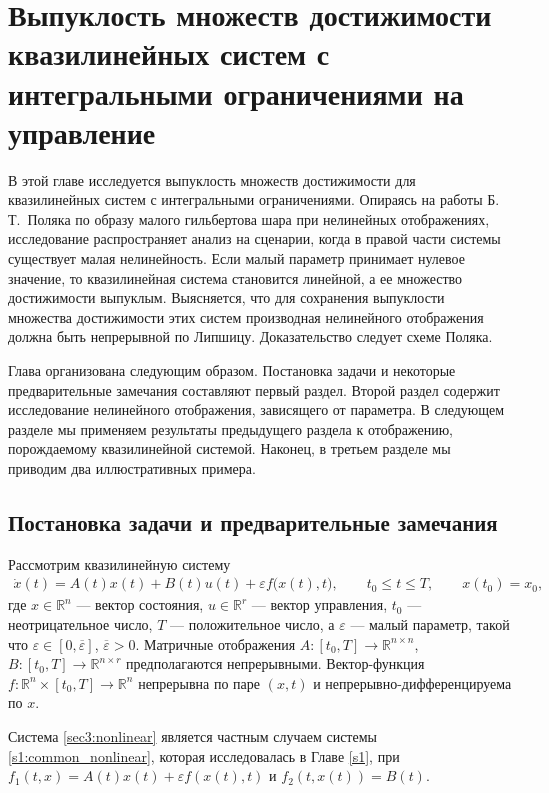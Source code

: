 \documentclass[../main.tex]{subfiles}
\begin{document}
\clearpage
\section{Выпуклость множеств достижимости квазилинейных систем с интегральными ограничениями на управление}
В этой главе исследуется выпуклость множеств достижимости для квазилинейных систем с интегральными ограничениями. 
Опираясь на работы Б.\,Т.~Поляка \cite{Polyak2001,Polyak2004} по образу малого гильбертова шара при нелинейных отображениях, исследование распространяет анализ на сценарии, когда в правой части системы существует малая нелинейность. 
Если малый параметр принимает нулевое значение, то квазилинейная система становится линейной, а ее множество достижимости выпуклым. 
Выясняется, что для сохранения выпуклости множества достижимости этих систем производная нелинейного отображения должна быть непрерывной по Липшицу. 
Доказательство следует схеме Поляка. 

Глава организована следующим образом. 
Постановка задачи и некоторые предварительные замечания составляют первый раздел. 
Второй раздел содержит исследование нелинейного отображения, зависящего от параметра. 
В следующем разделе мы применяем результаты предыдущего раздела к отображению, порождаемому квазилинейной системой. 
Наконец, в третьем разделе мы приводим два иллюстративных примера.

\subsection{Постановка задачи и предварительные замечания}

Рассмотрим квазилинейную систему
\begin{gather}\label{sec3:nonlinear}
 \dot{x}(t) = A(t)x(t)+B(t)u(t)+\varepsilon f\big(x(t),t\big), \qquad t_0 \leqslant t \leqslant T, \qquad x(t_0) = x_0,
\end{gather}
где $ x \in \mathbb{R}^n $ --- вектор состояния, $ u \in \mathbb{R}^r $ --- вектор управления, $t_0$ --- неотрицательное число, $T$ --- положительное число, а $\varepsilon$ --- малый параметр, такой что $\varepsilon \in [0,\overline{\varepsilon}]$, $ \overline{\varepsilon} > 0$. 
Матричные отображения $A:[t_0,T] \to \mathbb{R}^{n\times n} $, $B: [t_0,T] \to \mathbb{R}^{n\times r} $ предполагаются непрерывными. 
Вектор-функция $f: \mathbb{R}^n \times [t_0,T] \to \mathbb{R}^n$ непрерывна по паре $(x,t)$ и непрерывно-дифференцируема по $x$.

Система \eqref{sec3:nonlinear} является частным случаем системы \eqref{s1:common_nonlinear}, которая исследовалась в Главе \ref{s1}, при $f_1(t,x) = A(t) x(t) + \varepsilon f(x(t),t)$ и $f_2(t, x(t)) = B(t)$.
\end{document}
